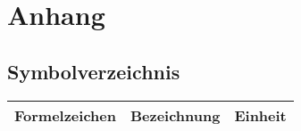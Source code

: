 \section*{Anhang}

\subsection{Symbolverzeichnis}
\begin{table}[H]
\begin{tabular}{|c|l|c|} \hline
\bf Formelzeichen & \bf Bezeichnung & \bf Einheit \\ \hline

\end{tabular}
\end{table}

\listoffigures

\listoftables

